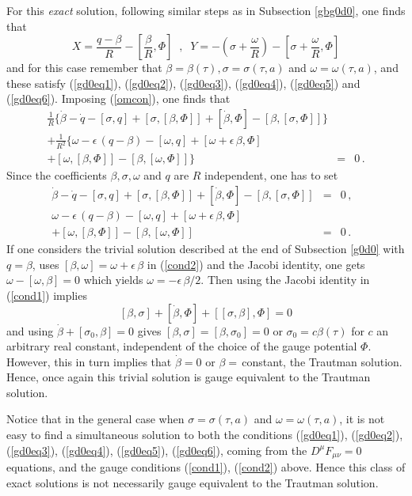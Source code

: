 \documentclass[a4paper,twocolumn,prd,showpacs,amsmath,amssymb]{revtex4}
\begin{document}
For this {\it exact} solution, following similar steps as in Subsection \ref{gbg0d0}, one
finds that
\[ X = \frac{q-\beta}{R} - [\frac{\beta}{R},\Phi] \;\; , \;\;
Y = - (\sigma + \frac{\omega}{R}) - [\sigma + \frac{\omega}{R},\Phi] \]
and for this case remember that $\beta=\beta(\tau), \sigma=\sigma(\tau,a)$ and $\omega=\omega(\tau,a)$, and these satisfy (\ref{gd0eq1}), (\ref{gd0eq2}),
(\ref{gd0eq3}), (\ref{gd0eq4}), (\ref{gd0eq5}) and (\ref{gd0eq6}). Imposing
(\ref{omcon}), one finds that
\begin{eqnarray*}
\frac{1}{R} \lbrace \dot{\beta} - \dot{q} - [\sigma,q] + [\sigma,[\beta,\Phi]]
+ [\dot{\beta},\Phi] - [\beta,[\sigma,\Phi]] \rbrace \\
+ \frac{1}{R^2} \lbrace \omega - \epsilon \, (q-\beta) - [\omega,q]
+ [\omega + \epsilon \, \beta,\Phi] \\
+ [\omega,[\beta,\Phi]]
- [\beta,[\omega,\Phi]] \rbrace & = & 0 \, .
\end{eqnarray*}
Since the coefficients $\beta, \sigma, \omega$ and $q$ are $R$ independent,
one has to set
\begin{eqnarray}
\dot{\beta} - \dot{q} - [\sigma,q] + [\sigma,[\beta,\Phi]]
+ [\dot{\beta},\Phi] - [\beta,[\sigma,\Phi]] & = & 0 \, , ~~~ \label{cond1} \\
\omega - \epsilon \, (q-\beta) - [\omega,q] + [\omega + \epsilon \, \beta,\Phi] \nonumber \\
+ [\omega,[\beta,\Phi]] - [\beta,[\omega,\Phi]] & = & 0 \, . ~~~ \label{cond2}
\end{eqnarray}
If one considers the trivial solution described at the end of Subsection \ref{g0d0}
with $q=\beta$, uses $[\beta,\omega]= \omega + \epsilon \, \beta$ in (\ref{cond2})
and the Jacobi identity, one gets $\omega-[\omega,\beta]=0$ which yields
$\omega = - \epsilon \, \beta /2$. Then using the Jacobi identity in (\ref{cond1})
implies
\[ [\beta,\sigma] + [\dot{\beta},\Phi] + [[\sigma,\beta],\Phi] =0 \]
and using $\dot{\beta} + [\sigma_{0},\beta]=0$ gives $[\beta,\sigma]=[\beta,\sigma_{0}]=0$
or $\sigma_{0}= c \beta(\tau)$ for $c$ an arbitrary real constant, independent of
the choice of the gauge potential $\Phi$. However, this in turn implies that
$\dot{\beta}=0$ or $\beta=\,$constant, the Trautman solution. Hence, once again this
trivial solution is gauge equivalent to the Trautman solution.

Notice that in the general case when $\sigma=\sigma(\tau,a)$ and
$\omega=\omega(\tau,a)$, it is not easy to find a simultaneous solution
to both the conditions (\ref{gd0eq1}), (\ref{gd0eq2}),
(\ref{gd0eq3}), (\ref{gd0eq4}), (\ref{gd0eq5}), (\ref{gd0eq6}),
coming from the $D^{\mu} F_{\mu\nu}=0$ equations, and the gauge conditions
(\ref{cond1}), (\ref{cond2}) above. Hence this class of exact solutions
is not necessarily gauge equivalent to the Trautman solution.
\end{document}
